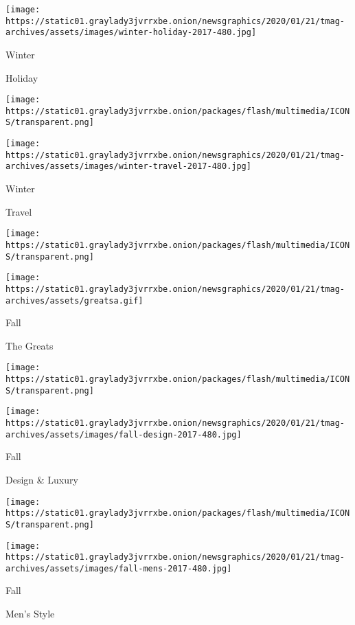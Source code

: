 \texttt{[image: https://static01.graylady3jvrrxbe.onion/newsgraphics/2020/01/21/tmag-archives/assets/images/winter-holiday-2017-480.jpg]}

Winter

Holiday

\href{https://www.nytimes3xbfgragh.onion/issue/t-magazine/2017/10/27/ts-nov-12-travel-issue}{}

\texttt{[image: https://static01.graylady3jvrrxbe.onion/packages/flash/multimedia/ICONS/transparent.png]}

\texttt{[image: https://static01.graylady3jvrrxbe.onion/newsgraphics/2020/01/21/tmag-archives/assets/images/winter-travel-2017-480.jpg]}

Winter

Travel

\href{https://www.nytimes3xbfgragh.onion/issue/t-magazine/2017/10/02/ts-oct-22-the-greats-issue}{}

\texttt{[image: https://static01.graylady3jvrrxbe.onion/packages/flash/multimedia/ICONS/transparent.png]}

\texttt{[image: https://static01.graylady3jvrrxbe.onion/newsgraphics/2020/01/21/tmag-archives/assets/greatsa.gif]}

Fall

The Greats

\href{https://www.nytimes3xbfgragh.onion/issue/t-magazine/2017/09/11/ts-sept-24-design-luxury-issue}{}

\texttt{[image: https://static01.graylady3jvrrxbe.onion/packages/flash/multimedia/ICONS/transparent.png]}

\texttt{[image: https://static01.graylady3jvrrxbe.onion/newsgraphics/2020/01/21/tmag-archives/assets/images/fall-design-2017-480.jpg]}

Fall

Design \& Luxury

\href{https://www.nytimes3xbfgragh.onion/issue/t-magazine/2017/09/05/ts-sept-10-mens-style-issue}{}

\texttt{[image: https://static01.graylady3jvrrxbe.onion/packages/flash/multimedia/ICONS/transparent.png]}

\texttt{[image: https://static01.graylady3jvrrxbe.onion/newsgraphics/2020/01/21/tmag-archives/assets/images/fall-mens-2017-480.jpg]}

Fall

Men's Style

\href{https://www.nytimes3xbfgragh.onion/issue/t-magazine/2017/08/11/ts-aug-20-womens-fashion-issue}{}

